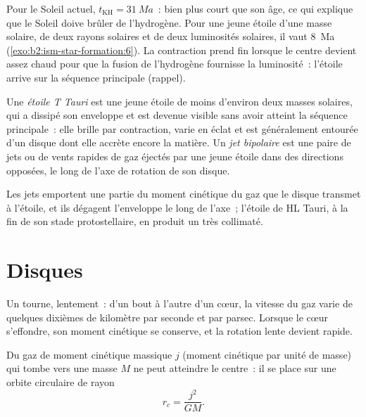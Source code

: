 Pour le Soleil actuel, $t_{\mathrm{KH}} = \qty{31}{Ma}$~: bien plus court que son âge, ce
qui explique que le Soleil doive brûler de l'hydrogène. Pour une jeune étoile d'une masse solaire, de deux rayons solaires et de deux luminosités solaires, il vaut \qty{8}{Ma}
(\cref{exo:b2:ism-star-formation:6}). La contraction prend fin lorsque le centre devient assez chaud pour que la fusion de l'hydrogène fournisse la luminosité~: l'étoile arrive sur la séquence
principale
(rappel).

\begin{definition}\label{def:b2:ism-star-formation:t-tauri}
Une \emph{étoile T Tauri} est une jeune étoile de moins d'environ
deux masses solaires, qui a dissipé son enveloppe et est devenue visible sans avoir atteint la séquence principale~: elle brille par contraction, varie en éclat et est
généralement entourée d'un disque dont elle accrète encore la matière. Un \emph{jet bipolaire} est une paire de jets ou de vents rapides de gaz éjectés par une jeune étoile dans des directions opposées, le long de l'axe de
rotation
de
son
disque.
\end{definition}

Les jets emportent une partie du moment cinétique du gaz que le disque
transmet à l'étoile, et ils dégagent l'enveloppe le long de l'axe~; l'étoile de HL Tauri, à la fin de son stade protostellaire, en produit un
très
collimaté.

\section{Disques}

Un  tourne, lentement~: d'un bout à l'autre d'un cœur, la vitesse du gaz varie
de quelques dixièmes de kilomètre par seconde et par parsec. Lorsque le cœur s'effondre, son moment cinétique se conserve, et la rotation lente devient
rapide.

\begin{proposition}\label{prop:b2:ism-star-formation:centrifugal}
Du gaz de moment cinétique massique $j$ (moment cinétique par unité de masse)
qui tombe vers une masse $M$ ne peut atteindre le centre~: il se place sur une orbite circulaire de
rayon
\[
  r_c = \frac{j^2}{G M}.
\]
\end{proposition}


